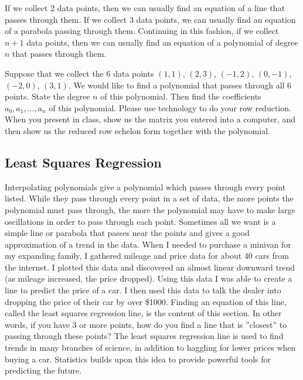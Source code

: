 If we collect 2 data points, then we can usually find an equation of a line that passes through them.  If we collect 3 data points, we can usually find an equation of a parabola passing through them.  Continuing in this fashion, if we collect $n+1$ data points, then we can usually find an equation of a polynomial of degree $n$ that passes through them.
\begin{problem}
Suppose that we collect the 6 data points $(1,1)$, $(2,3)$, $(-1,2)$, $(0,-1)$, $(-2,0)$, $(3,1)$. We would like to find a polynomial that passes through all 6 points. State the degree $n$ of this polynomial. Then find the coefficients $a_0, a_1, \ldots, a_n$ of this polynomial.  Please use technology to do your row reduction.  When you present in class, show us the matrix you entered into a computer, and then show us the reduced row echelon form together with the polynomial.
\end{problem}

\subsection{Least Squares Regression}

Interpolating polynomials give a polynomial which passes through every point
listed. While they pass through every point in a set of data, the more points
the polynomial must pass through, the more the polynomial may have to make
large oscillations in order to pass through each point. Sometimes all we want is a simple line or
parabola that passes near the points and gives a good approximation
of a trend in the data. When I needed to purchase a minivan for my expanding
family, I gathered mileage and price data for about 40 cars from the internet. I
plotted this data and discovered an almost linear downward trend (as mileage
increased, the price dropped). Using this data I was able to create a line to
predict the price of a car. I then used this data to talk the dealer into dropping
the price of their car by over \$1000. 
Finding an equation of this line, called
the least squares regression line, is the content of this section. In other words,
if you have 3 or more points, how do you find a line that is ”closest” to passing
through these points? The least squares regression line is used to find trends in
many branches of science, in addition to haggling for lower prices when buying
a car. Statistics builds upon this idea to provide powerful tools for predicting
the future.

